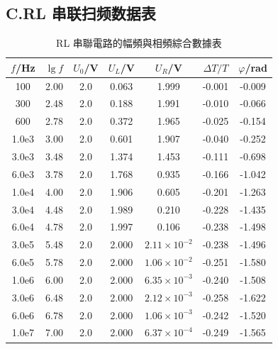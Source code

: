 \documentclass[a4paper,8pt,twocolumn]{article}
\begin{document}
\subsection*{C.\;RL 串联扫频数据表}
\begin{table}[h]
\centering
\caption{RL 串聯電路的幅頻與相頻綜合數據表}
\begin{tabular}{ccccccc}
\hline
$f$/Hz & $\lg f$ & $U_0$/V & $U_L$/V & $U_R$/V & $\Delta T/T$ & $\varphi$/rad \\ \hline
100       & 2.00 & 2.0 & 0.063 & 1.999   & -0.001 & -0.009 \\
300       & 2.48 & 2.0 & 0.188 & 1.991   & -0.010 & -0.066 \\
600       & 2.78 & 2.0 & 0.372 & 1.965   & -0.025 & -0.154 \\
1.0e3     & 3.00 & 2.0 & 0.601 & 1.907   & -0.040 & -0.252 \\
3.0e3     & 3.48 & 2.0 & 1.374 & 1.453   & -0.111 & -0.698 \\
6.0e3     & 3.78 & 2.0 & 1.768 & 0.935   & -0.166 & -1.042 \\
1.0e4     & 4.00 & 2.0 & 1.906 & 0.605   & -0.201 & -1.263 \\
3.0e4     & 4.48 & 2.0 & 1.989 & 0.210   & -0.228 & -1.435 \\
6.0e4     & 4.78 & 2.0 & 1.997 & 0.106   & -0.238 & -1.498 \\
3.0e5     & 5.48 & 2.0 & 2.000 & $2.11\times10^{-2}$ & -0.238 & -1.496 \\
6.0e5     & 5.78 & 2.0 & 2.000 & $1.06\times10^{-2}$ & -0.251 & -1.580 \\
1.0e6     & 6.00 & 2.0 & 2.000 & $6.35\times10^{-3}$ & -0.240 & -1.508 \\
3.0e6     & 6.48 & 2.0 & 2.000 & $2.12\times10^{-3}$ & -0.258 & -1.622 \\
6.0e6     & 6.78 & 2.0 & 2.000 & $1.06\times10^{-3}$ & -0.242 & -1.520 \\
1.0e7     & 7.00 & 2.0 & 2.000 & $6.37\times10^{-4}$ & -0.249 & -1.565 \\
\end{tabular}
\end{table}
\end{document}
